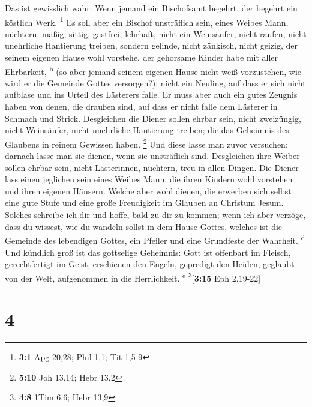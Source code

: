  Das ist gewisslich wahr: Wenn jemand ein Bischofsamt
begehrt, der begehrt ein köstlich Werk. \footnote{\textbf{3:1} Apg
  20,28; Phil 1,1; Tit 1,5-9}  Es soll aber ein Bischof
unsträflich sein, eines Weibes Mann, nüchtern, mäßig, sittig, gastfrei,
lehrhaft,  nicht ein Weinsäufer, nicht raufen, nicht
unehrliche Hantierung treiben, sondern gelinde, nicht zänkisch, nicht
geizig,  der seinem eigenen Hause wohl vorstehe, der
gehorsame Kinder habe mit aller Ehrbarkeit, \textsuperscript{b}
 (so aber jemand seinem eigenen Hause nicht weiß
vorzustehen, wie wird er die Gemeinde Gottes versorgen?); 
nicht ein Neuling, auf dass er sich nicht aufblase und ins Urteil des
Lästerers falle.  Er muss aber auch ein gutes Zeugnis
haben von denen, die draußen sind, auf dass er nicht falle dem Lästerer
in Schmach und Strick.  Desgleichen die Diener sollen
ehrbar sein, nicht zweizüngig, nicht Weinsäufer, nicht unehrliche
Hantierung treiben;  die das Geheimnis des Glaubens in
reinem Gewissen haben. \footnote{\textbf{5:10} Joh 13,14; Hebr 13,2}
 Und diese lasse man zuvor versuchen; darnach lasse man
sie dienen, wenn sie unsträflich sind.  Desgleichen ihre
Weiber sollen ehrbar sein, nicht Lästerinnen, nüchtern, treu in allen
Dingen.  Die Diener lass einen jeglichen sein eines
Weibes Mann, die ihren Kindern wohl vorstehen und ihren eigenen Häusern.
 Welche aber wohl dienen, die erwerben sich selbst eine
gute Stufe und eine große Freudigkeit im Glauben an Christum Jesum.
 Solches schreibe ich dir und hoffe, bald zu dir zu
kommen;  wenn ich aber verzöge, dass du wissest, wie du
wandeln sollst in dem Hause Gottes, welches ist die Gemeinde des
lebendigen Gottes, ein Pfeiler und eine Grundfeste der Wahrheit.
\textsuperscript{d}  Und kündlich groß ist das gottselige
Geheimnis: Gott ist offenbart im Fleisch, gerechtfertigt im Geist,
erschienen den Engeln, gepredigt den Heiden, geglaubt von der Welt,
aufgenommen in die Herrlichkeit. \textsuperscript{e}
\footnote{\textbf{4:8} 1Tim 6,6; Hebr 13,9}{[}\textbf{3:15} Eph
2,19-22{]}

\hypertarget{section-3}{%
\section{4}\label{section-3}}

